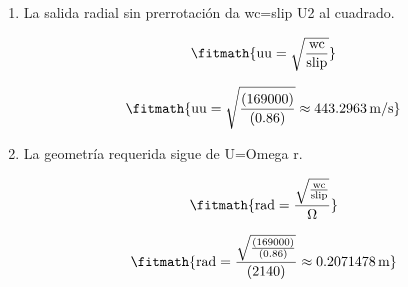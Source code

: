 \begin{enumerate}

\item La salida radial sin prerrotación da wc=slip U2 al cuadrado.

\[\fitmath{\mathrm{uu}=\sqrt{\frac{\mathrm{wc}}{\mathrm{slip}}}}\]

\[\fitmath{\mathrm{uu}=\sqrt{\frac{(169000)}{(0.86)}}\approx 443.2963\,\mathrm{m/s}}\]

\item La geometría requerida sigue de U=Omega r.

\[\fitmath{\mathrm{rad}=\frac{\sqrt{\frac{\mathrm{wc}}{\mathrm{slip}}}}{\Omega}}\]

\[\fitmath{\mathrm{rad}=\frac{\sqrt{\frac{(169000)}{(0.86)}}}{(2140)}\approx 0.2071478\,\mathrm{m}}\]

\end{enumerate}
